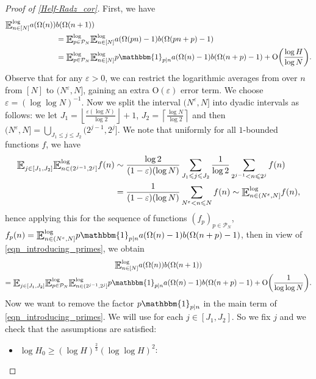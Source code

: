 \documentclass[letter,11pt]{article}
\theoremstyle{plain} %
\theoremstyle{definition} %
\theoremstyle{plain}
\theoremstyle{plain}
\theoremstyle{plain}
\numberwithin{equation}{section}
\newcommand{\Oh}{{\mathrm O}}
\renewcommand{\epsilon}{\varepsilon}
\renewcommand{\leq}{\leqslant}
\renewcommand{\geq}{\geqslant}
\newcommand{\E}{\raisebox{-0.4ex}{\scalebox{1.4}[1.3]{$\mathbb{E}$}}}
\newcommand{\Esub}[1]{\raisebox{-0.4ex}{\scalebox{1.4}[1.3]{$\mathbb{E}$}}\raisebox{-0.35ex}{\ensuremath{_{\scriptstyle #1}}}}
\newcommand{\logE}{{\E}^{\log}}
\newcommand{\1}{\mathbbm{1}}
\newcommand{\Pc}{\mathcal{P}}
\begin{document}
\begin{proof}[Proof of \cref{Helf-Radz_cor}]
    First, we have
    \begin{align}\label{eqn_introducing_primes}
        \logE_{n\in[N]} a(\Omega(n)) & b(\Omega(n+1)) \notag \\
        & = \logE_{p\in\Pc_N}\logE_{n\in[N]}  a(\Omega(pn)-1)b(\Omega(pn+p)-1) \notag \\
        & =\logE_{p\in\Pc_N}\logE_{n\in[N]} p\1_{p\mid n}a(\Omega(n)-1)b(\Omega(n+p)-1) + \Oh\bigg(\frac{\log{H}}{\log{N}}\bigg).
    \end{align}
    Observe that for any $\epsilon>0$, we can restrict the logarithmic averages from over $n$ from $[N]$ to $(N^\epsilon,N]$, gaining an extra $\Oh(\epsilon)$ error term. We choose $\epsilon = (\log\log{N})^{-1}$. Now we split the interval $(N^\epsilon,N]$ into dyadic intervals as follows: we let $J_1 = \left\lfloor\frac{\epsilon(\log{N})}{\log{2}}\right\rfloor+1$, $J_2 = \left\lceil\frac{\log{N}}{\log{2}}\right\rceil$ and then 
    $(N^\epsilon,N] = \bigcup_{J_1\leq j \leq J_2}(2^{j-1},2^j]$. We note that uniformly for all $1$-bounded functions $f$, we have
    \begin{align*}
        \Esub{j\in[J_1,J_2]}\logE_{n\in(2^{j-1},2^j]} f(n) 
        & \sim
        \frac{\log{2}}{(1-\epsilon)(\log{N})}\sum_{J_1\leq j\leq J_2}\frac{1}{\log{2}}\sum_{2^{j-1}<n\leq 2^j} f(n) \\
        & = \frac{1}{(1-\epsilon)(\log{N})}\sum_{N^\epsilon<n\leq N} f(n)
        \sim \logE_{n\in(N^\epsilon,N]} f(n),
    \end{align*}
    hence applying this for the sequence of functions $(f_p)_{p\in\Pc_N}$, $f_p(n)=\logE_{n\in(N^\epsilon,N]}p\1_{p\mid n} a(\Omega(n)-1)b(\Omega(n+p)-1)$, then in view of \eqref{eqn_introducing_primes}, we obtain
    \begin{multline}\label{split_into_dyadic}
        \logE_{n\in[N]}a(\Omega(n))b(\Omega(n+1)) \\
        = \Esub{j\in[J_1,J_2]}\logE_{p\in\Pc_N}\logE_{n\in(2^{j-1},2^j]}p\1_{p\mid n} a(\Omega(n)-1)b(\Omega(n+p)-1) + \Oh\bigg(\frac{1}{\log\log{N}}\bigg).
    \end{multline}
   Now we want to remove the factor $p\1_{p\mid n}$ in the main term of \eqref{eqn_introducing_primes}. We will use \cite[Corollary 1.4]{helf_radz} for each $j\in[J_1,J_2]$. So we fix $j$ and we check that the assumptions are satisfied:
    \begin{itemize}
        \item $\log{H_0}\geq(\log{H})^\frac{2}{3}(\log\log{H})^2$:

\end{itemize}
\end{proof}
\end{document}
